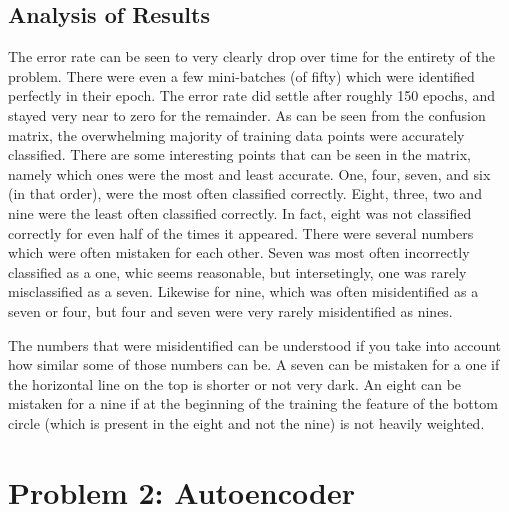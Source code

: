\documentclass[12pt, letterpaper, twoside]{article}
\begin{document}
\subsection{Analysis of Results}
The error rate can be seen to very clearly drop over time for the entirety of the problem. There were even 
a few mini-batches (of fifty) which were identified perfectly in their epoch. The error rate did settle after
 roughly 150 epochs, and stayed very near to zero 
for the remainder. As can be seen from the confusion matrix, the overwhelming majority of training data 
points were accurately classified. There are some interesting points that can be seen in the matrix, namely 
which ones were the most and least accurate. One, four, seven, and six (in that order), were the most often 
classified correctly. Eight, three, two and nine were the least often classified correctly. In fact, eight
was not classified correctly for even half of the times it appeared. There were several numbers which were 
often mistaken for each other. Seven was most often incorrectly classified as a one, whic seems reasonable, 
but intersetingly, one was rarely misclassified as a seven. Likewise for nine, which was often misidentified
as a seven or four, but four and seven were very rarely misidentified as nines. 

The numbers that were misidentified can be understood if you take into account how similar some of those numbers
can be. A seven can be mistaken for a one if the horizontal line on the top is shorter or not very dark. An eight 
can be mistaken for a nine if at the beginning of the training the feature of the bottom circle (which is present
in the eight and not the nine) is not heavily weighted. 

\section{Problem 2: Autoencoder}
\end{document}

